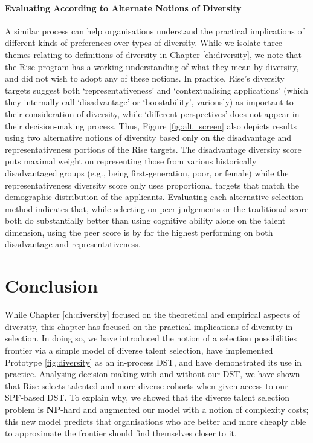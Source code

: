 \paragraph{Evaluating According to Alternate Notions of Diversity} A similar process can help organisations understand the practical implications of different kinds of preferences over types of diversity. While we isolate three themes relating to definitions of diversity in Chapter \ref{ch:diversity}, we note that the Rise program has a working understanding of what they mean by diversity, and did not wish to adopt any of these notions. In practice, Rise's diversity targets suggest both `representativeness' and `contextualising applications' (which they internally call `disadvantage' or `boostability', variously) as important to their consideration of diversity, while `different perspectives' does not appear in their decision-making process. Thus, Figure \ref{fig:alt_screen} also depicts results using two alternative notions of diversity based only on the disadvantage and representativeness portions of the Rise targets. The disadvantage diversity score puts maximal weight on representing those from various historically disadvantaged groups (e.g., being first-generation, poor, or female) while the representativeness diversity score only uses proportional targets that match the demographic distribution of the applicants. Evaluating each alternative selection method indicates that, while selecting on peer judgements or the traditional score both do substantially better than using cognitive ability alone on the talent dimension, using the peer score is by far the highest performing on both disadvantage and representativeness.

\section{Conclusion} \label{sec:conclusion}
While Chapter \ref{ch:diversity} focused on the theoretical and empirical aspects of diversity, this chapter has focused on the practical implications of diversity in selection. In doing so, we have introduced the notion of a selection possibilities frontier via a simple model of diverse talent selection, have implemented Prototype \ref{fig:diversity} as an in-process DST, and have demonstrated its use in practice. Analysing decision-making with and without our DST, we have shown that Rise selects talented and more diverse cohorts when given access to our SPF-based DST. To explain why, we showed that the diverse talent selection problem is $\mathbf{NP}$-hard and augmented our model with a notion of complexity costs; this new model predicts that organisations who are better and more cheaply able to approximate the frontier should find themselves closer to it. 

